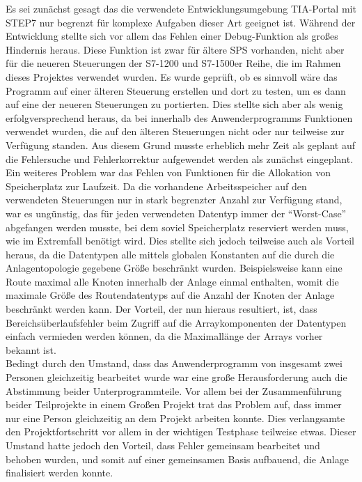 		Es sei zunächst gesagt das die verwendete Entwicklungsumgebung \ac{TIA-Portal} mit \ac{STEP7} nur begrenzt für komplexe Aufgaben dieser Art geeignet ist. Während der Entwicklung stellte sich vor allem das Fehlen einer Debug-Funktion als großes Hindernis heraus. Diese Funktion ist zwar für ältere \ac{SPS} vorhanden, nicht aber für die neueren Steuerungen der S7-1200 und S7-1500er Reihe, die im Rahmen dieses Projektes verwendet wurden. Es wurde geprüft, ob es sinnvoll wäre das Programm auf einer älteren Steuerung erstellen und dort zu testen, um es dann auf eine der neueren Steuerungen zu portierten. Dies stellte sich aber als wenig erfolgversprechend heraus, da bei innerhalb des Anwenderprogramms Funktionen verwendet wurden, die auf den älteren Steuerungen nicht oder nur teilweise zur Verfügung standen. Aus diesem Grund musste erheblich mehr Zeit als geplant auf die Fehlersuche und Fehlerkorrektur aufgewendet werden als zunächst eingeplant.
		\\[4pt]
		Ein weiteres Problem war das Fehlen von Funktionen für die Allokation von Speicherplatz zur Laufzeit. Da die vorhandene Arbeitsspeicher auf den verwendeten Steuerungen nur in stark begrenzter Anzahl zur Verfügung stand, war es ungünstig, das für jeden verwendeten  Datentyp immer der "`Worst-Case"' abgefangen werden musste, bei dem soviel Speicherplatz reserviert werden muss, wie im Extremfall benötigt wird. Dies stellte sich jedoch teilweise auch als Vorteil heraus, da die Datentypen alle mittels globalen Konstanten auf die durch die Anlagentopologie gegebene Größe beschränkt wurden. Beispielsweise kann eine Route maximal alle Knoten innerhalb der Anlage einmal enthalten, womit die maximale Größe des Routendatentyps auf die Anzahl der Knoten der Anlage beschränkt werden kann. Der Vorteil, der nun hieraus resultiert, ist, dass Bereichsüberlaufsfehler  beim Zugriff auf die Arraykomponenten der Datentypen einfach vermieden werden können, da die Maximallänge der Arrays vorher bekannt ist.
		\\[4pt]
		Bedingt durch den Umstand, dass das Anwenderprogramm von insgesamt zwei Personen gleichzeitig bearbeitet wurde war eine große Herausforderung auch die Abstimmung beider Unterprogrammteile. Vor allem bei der Zusammenführung beider Teilprojekte in einem Großen Projekt trat das Problem auf, dass immer nur eine Person gleichzeitig an dem Projekt arbeiten konnte. Dies verlangsamte den Projektfortschritt vor allem in der wichtigen Testphase teilweise etwas. Dieser Umstand hatte jedoch den Vorteil, dass Fehler gemeinsam bearbeitet und behoben wurden, und somit auf einer gemeinsamen Basis aufbauend, die Anlage finalisiert werden konnte.
		
